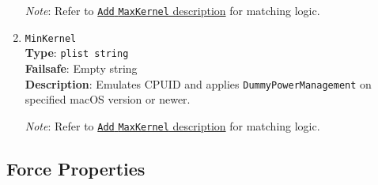 \documentclass[]{article}
\begin{document}
\begin{enumerate}
  \emph{Note}: Refer to \hyperlink{kernmatch}{\texttt{Add} \texttt{MaxKernel} description} for matching logic.

\item
  \texttt{MinKernel}\\
  \textbf{Type}: \texttt{plist\ string}\\
  \textbf{Failsafe}: Empty string\\
  \textbf{Description}: Emulates CPUID and applies \texttt{DummyPowerManagement} on specified macOS version or newer.

  \emph{Note}: Refer to \hyperlink{kernmatch}{\texttt{Add} \texttt{MaxKernel} description} for matching logic.

\end{enumerate}

\subsection{Force Properties}\label{kernelpropsforce}
\end{document}
